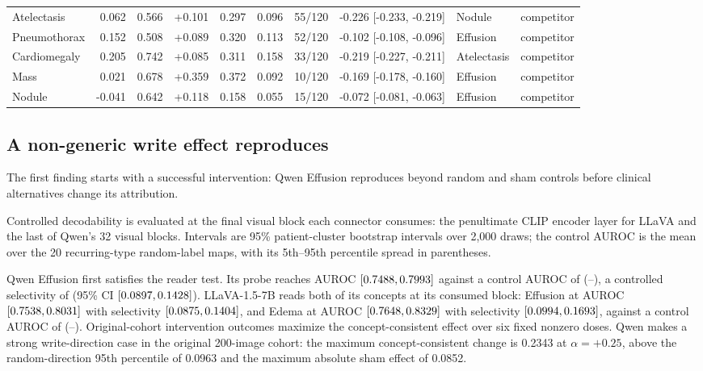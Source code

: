 \documentclass{article}
\providecommand{\DIFaddendFL}{} %
\DeclareRobustCommand{\DIFaddendFL}{\DIFOaddendFL \let\includegraphics\DIFOincludegraphics} %
\begin{document}
\begin{table}[t]
{\begin{tabular}{lrrrrrrrll}
Atelectasis & 0.062 & 0.566 & +0.101 & 0.297 & 0.096 & 55/120 & \cellcolor{cfSlate3}-0.226 [-0.233, -0.219] & Nodule & competitor \\
Pneumothorax & 0.152 & 0.508 & +0.089 & 0.320 & 0.113 & 52/120 & \cellcolor{cfSlate3}-0.102 [-0.108, -0.096] & Effusion & competitor \\
Cardiomegaly & 0.205 & 0.742 & +0.085 & 0.311 & 0.158 & 33/120 & \cellcolor{cfSlate3}-0.219 [-0.227, -0.211] & Atelectasis & competitor \\
Mass & 0.021 & 0.678 & +0.359 & 0.372 & 0.092 & 10/120 & \cellcolor{cfSlate3}-0.169 [-0.178, -0.160] & Effusion & competitor \\
Nodule & -0.041 & 0.642 & +0.118 & 0.158 & 0.055 & 15/120 & \cellcolor{cfSlate2}-0.072 [-0.081, -0.063] & Effusion & competitor \\
\bottomrule
\end{tabular}}
\DIFaddendFL \end{table}

\subsection{A non-generic write effect reproduces}
\label{sec:qwen-replication}

The first finding starts with a successful intervention: Qwen Effusion reproduces beyond random and sham controls before clinical alternatives change its attribution.

Controlled decodability is evaluated at the final visual block each connector consumes: the penultimate CLIP encoder layer for LLaVA and the last of Qwen's 32 visual blocks. Intervals are 95\% patient-cluster bootstrap intervals over 2,000 draws; the control AUROC is the mean over the 20 recurring-type random-label maps, with its 5th--95th percentile spread in parentheses.

Qwen Effusion first satisfies the reader test. Its probe reaches AUROC \cfSeedDecQwenEffAuroc{} $[0.7488,0.7993]$ against a control AUROC of \cfSeedDecQwenEffCtrl{} (\cfSeedDecQwenEffCtrlLo--\cfSeedDecQwenEffCtrlHi), a controlled selectivity of \cfSeedDecQwenEffSel{} (95\% CI $[0.0897,0.1428]$). LLaVA-1.5-7B reads both of its concepts at its consumed block: Effusion at AUROC \cfSeedDecLlavaEffAuroc{} $[0.7538,0.8031]$ with selectivity \cfSeedDecLlavaEffSel{} $[0.0875,0.1404]$, and Edema at AUROC \cfSeedDecLlavaEdemaAuroc{} $[0.7648,0.8329]$ with selectivity \cfSeedDecLlavaEdemaSel{} $[0.0994,0.1693]$, against a control AUROC of \cfSeedDecLlavaEffCtrl{} (\cfSeedDecLlavaEffCtrlLo--\cfSeedDecLlavaEffCtrlHi). Original-cohort intervention outcomes maximize the concept-consistent effect over six fixed nonzero doses. Qwen makes a strong write-direction case in the original 200-image cohort: the maximum concept-consistent change is 0.2343 at $\alpha=+0.25$, above the random-direction 95th percentile of 0.0963 and the maximum absolute sham effect of 0.0852.
\end{document}
